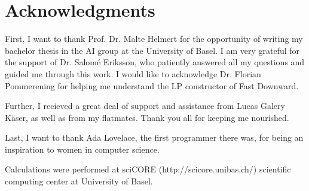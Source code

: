 \chapter{Acknowledgments}\label{ch:acknowledgments}
First, I want to thank Prof. Dr. Malte Helmert for the opportunity of writing my bachelor thesis in the AI group at the University of Basel.
I am very grateful for the support of Dr. Salom\'e Eriksson, who patiently answered all my questions and guided me through this work.
I would like to acknowledge Dr. Florian Pommerening for helping me understand the LP constructor of Fast Downward.


Further, I recieved a great deal of support and assistance from Lucas Galery K\"aser, as well as from my flatmates.
Thank you all for keeping me nourished.

Last, I want to thank Ada Lovelace, the first programmer there was, for being an inspiration to women in computer science.

Calculations were performed at sciCORE (http://scicore.unibas.ch/) scientific computing center at University of Basel.